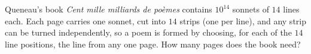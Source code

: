 Queneau's book \emph{Cent mille milliards de po\`emes} contains $10^{14}$ sonnets of $14$ lines each. Each page carries one sonnet, cut into $14$ strips (one per line), and any strip can be turned independently, so a poem is formed by choosing, for each of the $14$ line positions, the line from any one page. How many pages does the book need?
